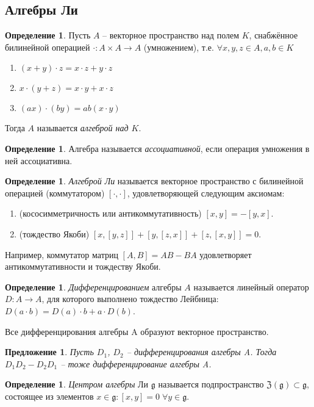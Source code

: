 \documentclass[12pt]{article}
\newtheorem{predl}[theorem]{Предложение}
\theoremstyle{definition}
\newtheorem{defin}[theorem]{Определение}
\begin{document}
\subsection{Алгебры Ли}
\begin{defin}
Пусть $A$ -- векторное пространство над полем $K$, снабжённое билинейной операцией $\cdot:A\times A\rightarrow A$ (умножением), т.е. $\forall x,y,z\in A,a,b\in K$
\begin{enumerate}
    \item $(x+y)\cdot z=x\cdot z+y\cdot z$
    \item $x\cdot(y+z)=x\cdot y+x\cdot z$
    \item $(ax)\cdot(by)=ab(x\cdot y)$
\end{enumerate}
Тогда $A$ называется \textit{алгеброй над $K$}.
\end{defin}
\begin{defin}
Алгебра называется \textit{ассоциативной}, если операция умножения в ней ассоциативна.
\end{defin}
\begin{defin}
\textit{Алгеброй Ли} называется векторное пространство с билинейной операцией (коммутатором) $[\cdot,\cdot]$, удовлетворяющей следующим аксиомам:
\begin{enumerate}
    \item (кососимметричность или антикоммутативность) $[x, y] = -[y, x]$.
    \item (тождество Якоби) $[x, [y, z]] + [y, [z, x]] + [z, [x, y]] = 0$.
\end{enumerate}
\end{defin}
Например, коммутатор матриц $[A, B] = AB - BA$ удовлетворяет антикоммутативности и тождеству Якоби.
\begin{defin}
    \textit{Дифференцированием} алгебры $A$ называется линейный оператор $D: A \rightarrow A$, для которого выполнено тождество Лейбница: $D(a\cdot b) = D(a)\cdot b + a\cdot D(b)$.
\end{defin} 
Все дифференцирования алгебры A образуют векторное пространство.
\begin{predl}
Пусть $D_1$, $D_2$ -- дифференцирования алгебры A. Тогда $D_1D_2-D_2D_1$ -- тоже дифференцирование алгебры A.
\end{predl}
\begin{defin}
\textit{Центром алгебры} Ли $\mathfrak{g}$ называется подпространство $\mathfrak{Z}(\mathfrak{g})\subset \mathfrak{g}$, состоящее из элементов $x \in \mathfrak{g}:[x,y]=0\;\forall y\in\mathfrak{g}$.
\end{defin}
\end{document}

